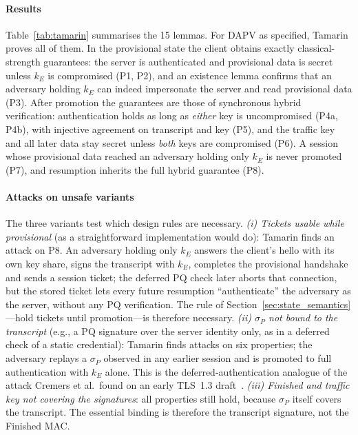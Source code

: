 \documentclass[preprint,10pt,3p]{elsarticle}
\begin{document}
\paragraph{Results} Table~\ref{tab:tamarin} summarises the 15 lemmas.  For
DAPV as specified, Tamarin proves all of them.  In the provisional state
the client obtains exactly classical-strength guarantees: the server is
authenticated and provisional data is secret unless $k_E$ is compromised
(P1, P2), and an existence lemma confirms that an adversary holding $k_E$
can indeed impersonate the server and read provisional data (P3).  After
promotion the guarantees are those of synchronous hybrid verification:
authentication holds as long as \emph{either} key is uncompromised (P4a,
P4b), with injective agreement on transcript and key (P5), and the traffic
key and all later data stay secret unless \emph{both} keys are compromised
(P6).  A session whose provisional data reached an adversary holding only
$k_E$ is never promoted (P7), and resumption inherits the full hybrid
guarantee (P8).

\paragraph{Attacks on unsafe variants} The three variants test which
design rules are necessary.
\emph{(i) Tickets usable while provisional} (as a straightforward
implementation would do): Tamarin finds an attack on P8.  An adversary
holding only $k_E$ answers the client's hello with its own key share, signs
the transcript with $k_E$, completes the provisional handshake and sends a
session ticket; the deferred PQ check later aborts that connection, but the
stored ticket lets every future resumption ``authenticate'' the adversary
as the server, without any PQ verification.  The rule of
Section~\ref{sec:state_semantics}---hold tickets until promotion---is
therefore necessary.
\emph{(ii) $\sigma_P$ not bound to the transcript} (e.g., a PQ signature
over the server identity only, as in a deferred check of a static
credential): Tamarin finds attacks on six properties; the adversary replays
a $\sigma_P$ observed in any earlier session and is promoted to full
authentication with $k_E$ alone.  This is the deferred-authentication
analogue of the attack Cremers et al.\ found on an early TLS~1.3
draft~\cite{Cremers2016}.
\emph{(iii) Finished and traffic key not covering the signatures}: all
properties still hold, because $\sigma_P$ itself covers the transcript.
The essential binding is therefore the transcript signature, not the
Finished MAC.
\end{document}
